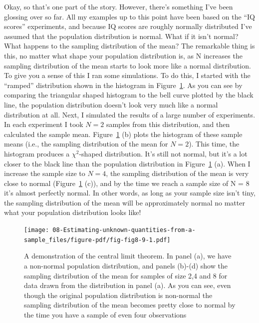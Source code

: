 \documentclass[
  a4paper,
]{book}
\begin{document}
Okay, so that's one part of the story. However, there's something I've
been glossing over so far. All my examples up to this point have been
based on the ``IQ scores'' experiments, and because IQ scores are
roughly normally distributed I've assumed that the population
distribution is normal. What if it isn't normal? What happens to the
sampling distribution of the mean? The remarkable thing is this, no
matter what shape your population distribution is, as N increases the
sampling distribution of the mean starts to look more like a normal
distribution. To give you a sense of this I ran some simulations. To do
this, I started with the ``ramped'' distribution shown in the histogram
in Figure~\ref{fig-fig8-9}. As you can see by comparing the triangular
shaped histogram to the bell curve plotted by the black line, the
population distribution doesn't look very much like a normal
distribution at all. Next, I simulated the results of a large number of
experiments. In each experiment I took \(N = 2\) samples from this
distribution, and then calculated the sample mean.
Figure~\ref{fig-fig8-9} (b) plots the histogram of these sample means
(i.e., the sampling distribution of the mean for \(N = 2\)). This time,
the histogram produces a \(\chi^2\)-shaped distribution. It's still not
normal, but it's a lot closer to the black line than the population
distribution in Figure~\ref{fig-fig8-9} (a). When I increase the sample
size to \(N = 4\), the sampling distribution of the mean is very close
to normal (Figure~\ref{fig-fig8-9} (c)), and by the time we reach a
sample size of N = 8 it's almost perfectly normal. In other words, as
long as your sample size isn't tiny, the sampling distribution of the
mean will be approximately normal no matter what your population
distribution looks like!

\begin{figure}

\texttt{[image: 08-Estimating-unknown-quantities-from-a-sample\_files/figure-pdf/fig-fig8-9-1.pdf]} \hfill{}

\caption{\label{fig-fig8-9}A demonstration of the central limit theorem.
In panel (a), we have a non-normal population distribution, and panels
(b)-(d) show the sampling distribution of the mean for samples of size
2,4 and 8 for data drawn from the distribution in panel (a). As you can
see, even though the original population distribution is non-normal the
sampling distribution of the mean becomes pretty close to normal by the
time you have a sample of even four observations}

\end{figure}
\end{document}
